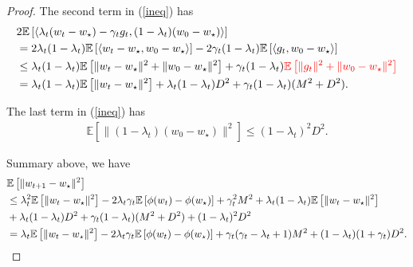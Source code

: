 \begin{proof}
	The second term in (\ref{ineq}) has
	\begin{align}
		&2\mathbb{E}\left[ \left<\lambda_t(w_t-w_\star) - \gamma_t g_t,(1-\lambda_t)(w_0-w_\star) \right> \right]\\
		&=2\lambda_t(1-\lambda_t)\mathbb{E}\left[ \left<w_t-w_\star,w_0-w_\star \right> \right]
		-2\gamma_t(1-\lambda_t) \mathbb{E}\left[ \left<g_t,w_0-w_\star \right> \right]\\
		&\leq \lambda_t(1-\lambda_t) \mathbb{E}\left[ \|w_t-w_\star\|^2+\|w_0-w_\star\|^2 \right]
		+\gamma_t(1-\lambda_t) \color{red}{\mathbb{E}\left[ \|g_t\|^2+\|w_0-w_\star\|^2 \right]}\\
		&= \lambda_t(1-\lambda_t) \mathbb{E}\left[ \|w_t-w_\star\|^2\right]+ \lambda_t(1-\lambda_t)D^2 +\gamma_t(1-\lambda_t)(M^2+D^2).
	\end{align}
	
	The last term in (\ref{ineq}) has
	\begin{align}
		\mathbb{E}\left[ \|(1-\lambda_t)(w_0-w_\star)\|^2 \right]\leq (1-\lambda_t)^2 D^2.
	\end{align}
	
	Summary above, we have
	\begin{align}
		&\mathbb{E}\left[ \|w_{t+1}-w_\star \|^2 \right]\\
		\notag
		&\leq \lambda_t^2 \mathbb{E}\left[ \|w_t-w_\star\|^2 \right]
		-2\lambda_t\gamma_t\mathbb{E}\left[ \phi(w_t)-\phi(w_\star) \right]+\gamma_t^2 M^2
		+\lambda_t(1-\lambda_t) \mathbb{E}\left[ \|w_t-w_\star\|^2\right]\\
		&+ \lambda_t(1-\lambda_t)D^2 + \gamma_t(1-\lambda_t)(M^2+D^2)
		+ (1-\lambda_t)^2 D^2\\
		&=\lambda_t\mathbb{E}\left[ \|w_t-w_\star\|^2 \right]
		-2\lambda_t\gamma_t\mathbb{E}\left[ \phi(w_t)-\phi(w_\star) \right]
		+\gamma_t(\gamma_t-\lambda_t+1) M^2 + (1-\lambda_t)(1+\gamma_t) D^2.
	\end{align}
\end{proof}

